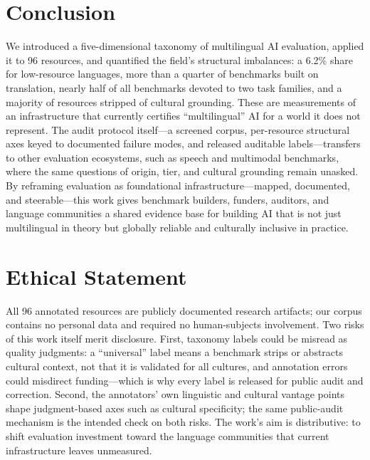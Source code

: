 \documentclass[letterpaper]{article} %
\begin{document}
\section{Conclusion}
We introduced a five-dimensional taxonomy of multilingual AI evaluation, applied it to 96 resources, and quantified the field's structural imbalances: a 6.2\% share for low-resource languages, more than a quarter of benchmarks built on translation, nearly half of all benchmarks devoted to two task families, and a majority of resources stripped of cultural grounding. These are measurements of an infrastructure that currently certifies ``multilingual'' AI for a world it does not represent. The audit protocol itself---a screened corpus, per-resource structural axes keyed to documented failure modes, and released auditable labels---transfers to other evaluation ecosystems, such as speech and multimodal benchmarks, where the same questions of origin, tier, and cultural grounding remain unasked. By reframing evaluation as foundational infrastructure---mapped, documented, and steerable---this work gives benchmark builders, funders, auditors, and language communities a shared evidence base for building AI that is not just multilingual in theory but globally reliable and culturally inclusive in practice.



\section*{Ethical Statement}
All 96 annotated resources are publicly documented research artifacts; our corpus contains no personal data and required no human-subjects involvement. Two risks of this work itself merit disclosure. First, taxonomy labels could be misread as quality judgments: a ``universal'' label means a benchmark strips or abstracts cultural context, not that it is validated for all cultures, and annotation errors could misdirect funding---which is why every label is released for public audit and correction. Second, the annotators' own linguistic and cultural vantage points shape judgment-based axes such as cultural specificity; the same public-audit mechanism is the intended check on both risks. The work's aim is distributive: to shift evaluation investment toward the language communities that current infrastructure leaves unmeasured.



% 
\end{document}
